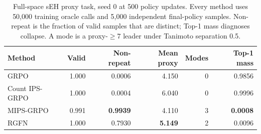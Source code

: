 \begin{table}[htbp]
\centering
\caption{Full-space sEH proxy task, seed 0 at 500 policy updates. Every method
uses 50,000 training oracle calls and 5,000 independent final-policy samples.
Non-repeat is the fraction of valid samples that are distinct; Top-1 mass
diagnoses collapse. A mode is a proxy-\(\geq7\) leader under Tanimoto
separation 0.5.}
\label{tab:molecule-main}
\begin{tabular}{lrrrrr}
\toprule
Method & Valid & Non-repeat & Mean proxy & Modes & Top-1 mass \\
\midrule
GRPO & 1.000 & 0.0006 & 4.150 & 0 & 0.9856 \\
Count IPS-GRPO & 1.000 & 0.0004 & 6.040 & 0 & 0.9996 \\
MIPS-GRPO & 0.991 & \textbf{0.9939} & 4.110 & 3 & \textbf{0.0008} \\
RGFN & 1.000 & 0.7930 & \textbf{5.149} & 2 & 0.0096 \\
\bottomrule
\end{tabular}
\end{table}
